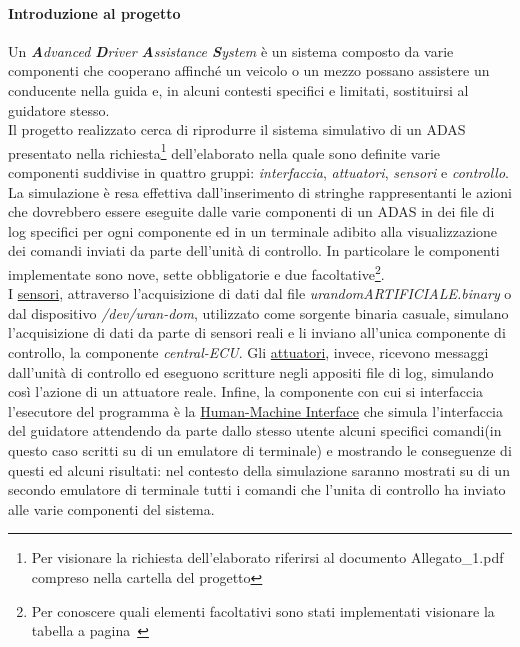 \documentclass[11pt, openany]{article}
\theoremstyle{definition}
\theoremstyle{plain}
\theoremstyle{remark}
\begin{document}
		\paragraph{Introduzione al progetto}
			Un \textit{\textbf{A}dvanced \textbf{D}river \textbf{A}ssistance \textbf{S}ystem} è un sistema composto da varie componenti che cooperano affinché un veicolo o un mezzo possano assistere un conducente nella guida e, in alcuni contesti specifici e limitati, sostituirsi al guidatore stesso.\\
			Il progetto realizzato cerca di riprodurre il sistema simulativo di un ADAS presentato nella richiesta\footnote{Per visionare la richiesta dell'elaborato riferirsi al documento Allegato\_1.pdf compreso nella cartella del progetto} dell'elaborato nella quale sono definite varie componenti suddivise in quattro gruppi: \textit{interfaccia}, \textit{attuatori}, \textit{sensori} e \textit{controllo}.\\
			La simulazione è resa effettiva dall'inserimento di stringhe rappresentanti le azioni che dovrebbero essere eseguite dalle varie componenti di un ADAS in dei file di log specifici per ogni componente ed in un terminale adibito alla visualizzazione dei comandi inviati da parte dell'unità di controllo. In particolare le componenti implementate sono nove, sette obbligatorie e due facoltative\footnote{Per conoscere quali elementi facoltativi sono stati implementati visionare la tabella a pagina~\pageref{tab:facoltativi}}.\\
			I \underline{sensori}, attraverso l'acquisizione di dati dal file \textit{urandomARTIFICIALE.binary} o dal dispositivo \textit{/dev/uran-dom}, utilizzato come sorgente binaria casuale, simulano l'acquisizione di dati da parte di sensori reali e li inviano all'unica componente di controllo, la componente \textit{central-ECU}.
			Gli \underline{attuatori}, invece, ricevono messaggi dall'unità di controllo ed eseguono scritture negli appositi file di log, simulando così l'azione di un attuatore reale.
			Infine, la componente con cui si interfaccia l'esecutore del programma è la \underline{Human-Machine Interface} che simula l'interfaccia del guidatore attendendo da parte dallo stesso utente alcuni specifici comandi(in questo caso scritti su di un emulatore di terminale) e mostrando le conseguenze di questi ed alcuni risultati: nel contesto della simulazione saranno mostrati su di un secondo emulatore di terminale tutti i comandi che l'unita di controllo ha inviato alle varie componenti del sistema.
\end{document}
